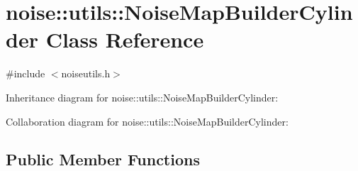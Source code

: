 \hypertarget{classnoise_1_1utils_1_1_noise_map_builder_cylinder}{\section{noise\+:\+:utils\+:\+:Noise\+Map\+Builder\+Cylinder Class Reference}
\label{classnoise_1_1utils_1_1_noise_map_builder_cylinder}
}


{\ttfamily \#include $<$noiseutils.\+h$>$}



Inheritance diagram for noise\+:\+:utils\+:\+:Noise\+Map\+Builder\+Cylinder\+:


Collaboration diagram for noise\+:\+:utils\+:\+:Noise\+Map\+Builder\+Cylinder\+:
\subsection*{Public Member Functions}
